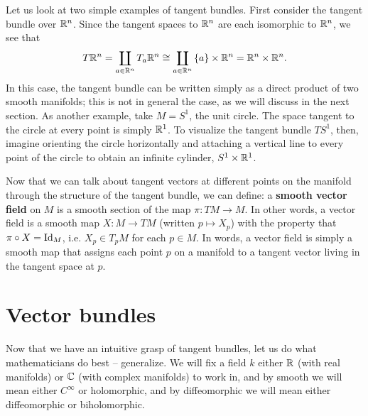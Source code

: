 \documentclass{../../mathnotes}
\begin{document}
Let us look at two simple examples of tangent bundles. First consider the tangent bundle over $\mathbb{R}^n$. Since the tangent spaces
to $\mathbb{R}^n$ are each isomorphic to $\mathbb{R}^n$, we see that
\[T\mathbb{R}^n=\coprod_{a\in\mathbb{R}^n} T_a\mathbb{R}^n\cong \coprod_{a\in\mathbb{R}^n}\left\{ a \right\}\times\mathbb{R}^n=\mathbb{R}^n\times\mathbb{R}^n.\]
In this case, the tangent bundle can be written simply as a direct product of two smooth manifolds; this is not in general
the case, as we will discuss in the next section. As another example, take $M=S^1$, the unit circle. The space tangent to the circle
at every point is simply $\mathbb{R}^1$. To visualize the tangent bundle $TS^1$, then, imagine orienting the circle horizontally and attaching a
vertical line to every point of the circle to obtain an infinite cylinder, $S^1\times\mathbb{R}^1$.

Now that we can talk about tangent vectors at different points on the manifold through the structure of the tangent bundle,
we can define: a \textbf{smooth vector field} on $M$ is a smooth section of the map $\pi: TM\to M$. In other words, a vector field is a smooth
map $X:M\to TM$ (written $p\mapsto X_p$) with the property that $\pi\circ X=\operatorname{Id}_M$, i.e. $X_p\in T_pM$ for each $p\in M$. In words,
a vector field is simply a smooth map that assigns each point $p$ on a manifold to a tangent vector living in the tangent space at $p$.

\section{Vector bundles}

Now that we have an intuitive grasp of tangent bundles, let us do what mathematicians do best -- generalize.
We will fix a field $k$ either $\mathbb{R}$ (with real manifolds) or $\mathbb{C}$ (with complex manifolds) to work in, and by smooth we will mean either
$C^\infty$ or holomorphic, and by diffeomorphic we will mean either diffeomorphic or biholomorphic.
\end{document}
